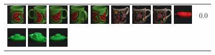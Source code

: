 \begin{figure}[tbp]
\begin{center}
\begin{tabular}{m{11cm} | m{3cm} |}
\includegraphics[width=1cm]{coil/beeld-32.eps}
\includegraphics[width=1cm]{coil/beeld-31.eps}
\includegraphics[width=1cm]{coil/beeld-30.eps}
\includegraphics[width=1cm]{coil/beeld-34.eps}
\includegraphics[width=1cm]{coil/beeld-33.eps}
\includegraphics[width=1cm]{coil/beeld-63.eps}
\includegraphics[width=1cm]{coil/beeld-60.eps}
\includegraphics[width=1cm]{coil/beeld-60.eps}
\includegraphics[width=1cm]{coil/beeld-18.eps}
& {\scriptsize 0.0}
\\
\includegraphics[width=1cm]{coil/beeld-54.eps}
\includegraphics[width=1cm]{coil/beeld-58.eps}
\includegraphics[width=1cm]{coil/beeld-55.eps}

\end{tabular}
\end{center}
\end{figure}
